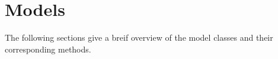 
%
%
%


\chapter{Models}
\label{MODELS CHAPTER}

The following sections give a breif overview of the model classes and their corresponding methods.

 


%



